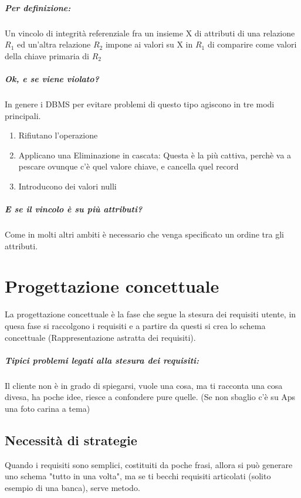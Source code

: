 \documentclass[12pt, a4paper, openany, twoside]{book}
\begin{document}
\paragraph{Per definizione:} Un vincolo di integrità referenziale fra un 
insieme X di attributi di una relazione $R_{1}$ ed un'altra relazione $R_{2}$
impone ai valori su X in $R_{1}$ di comparire come valori della chiave primaria
di $R_{2}$
\paragraph{Ok, e se viene violato?} In genere i DBMS per evitare problemi di 
questo tipo agiscono in tre modi principali.
\begin{enumerate}
	\item Rifiutano l'operazione
	\item Applicano una Eliminazione in cascata: Questa è la più cattiva, perchè
	va a pescare ovunque c'è quel valore chiave, e cancella quel record
	\item Introducono dei valori nulli
\end{enumerate}
\paragraph{E se il vincolo è su più attributi?} Come in molti altri ambiti è
necessario che venga specificato un ordine tra gli attributi.
\chapter{Progettazione concettuale}
La progettazione concettuale è la fase che segue la stesura dei requisiti utente,
in quesa fase si raccolgono i requisiti e a partire da questi si crea lo schema
concettuale (Rappresentazione astratta dei requisiti).
\paragraph{Tipici problemi legati alla stesura dei requisiti:} Il cliente non 
è in grado di spiegarsi, vuole una cosa, ma ti racconta una cosa divesa, ha 
poche idee, riesce a confondere pure quelle. (Se non sbaglio c'è su Aps una foto
carina a tema)
\section{Necessità di strategie}
Quando i requisiti sono semplici, costituiti da poche frasi, allora si può generare
uno schema "tutto in una volta", ma se ti becchi requisiti articolati (solito
esempio di una banca), serve metodo.
\end{document}
